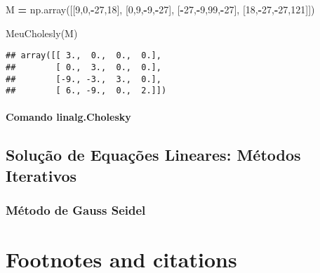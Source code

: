 \documentclass[
]{book}
\newenvironment{Shaded}{\begin{snugshade}}{\end{snugshade}}
\newcommand{\DecValTok}[1]{\textcolor[rgb]{0.00,0.00,0.81}{#1}}
\newcommand{\NormalTok}[1]{#1}
\newcommand{\OperatorTok}[1]{\textcolor[rgb]{0.81,0.36,0.00}{\textbf{#1}}}
\begin{document}
\begin{Shaded}
\begin{Highlighting}[]
\NormalTok{M }\OperatorTok{=}\NormalTok{ np.array([[}\DecValTok{9}\NormalTok{,}\DecValTok{0}\NormalTok{,}\OperatorTok{{-}}\DecValTok{27}\NormalTok{,}\DecValTok{18}\NormalTok{],}
\NormalTok{              [}\DecValTok{0}\NormalTok{,}\DecValTok{9}\NormalTok{,}\OperatorTok{{-}}\DecValTok{9}\NormalTok{,}\OperatorTok{{-}}\DecValTok{27}\NormalTok{],}
\NormalTok{              [}\OperatorTok{{-}}\DecValTok{27}\NormalTok{,}\OperatorTok{{-}}\DecValTok{9}\NormalTok{,}\DecValTok{99}\NormalTok{,}\OperatorTok{{-}}\DecValTok{27}\NormalTok{],}
\NormalTok{              [}\DecValTok{18}\NormalTok{,}\OperatorTok{{-}}\DecValTok{27}\NormalTok{,}\OperatorTok{{-}}\DecValTok{27}\NormalTok{,}\DecValTok{121}\NormalTok{]])}

\NormalTok{MeuCholesly(M)}
\end{Highlighting}
\end{Shaded}

\begin{verbatim}
## array([[ 3.,  0.,  0.,  0.],
##        [ 0.,  3.,  0.,  0.],
##        [-9., -3.,  3.,  0.],
##        [ 6., -9.,  0.,  2.]])
\end{verbatim}

\hypertarget{comando-linalg.cholesky}{%
\subsubsection{Comando linalg.Cholesky}\label{comando-linalg.cholesky}}

\hypertarget{soluuxe7uxe3o-de-equauxe7uxf5es-lineares-muxe9todos-iterativos}{%
\section{Solução de Equações Lineares: Métodos Iterativos}\label{soluuxe7uxe3o-de-equauxe7uxf5es-lineares-muxe9todos-iterativos}}

\hypertarget{muxe9todo-de-gauss-seidel}{%
\subsection{Método de Gauss Seidel}\label{muxe9todo-de-gauss-seidel}}

\hypertarget{footnotes-and-citations}{%
\chapter{Footnotes and citations}\label{footnotes-and-citations}}
\end{document}
